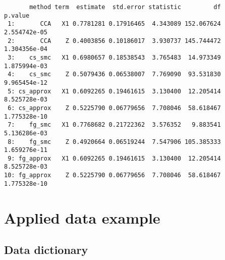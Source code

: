 \documentclass[
  12pt,
  a4paper,
]{article}
\begin{document}
\begin{verbatim}
       method term  estimate  std.error statistic         df      p.value
 1:       CCA   X1 0.7781281 0.17916465  4.343089 152.067624 2.554742e-05
 2:       CCA    Z 0.4003856 0.10186017  3.930737 145.744472 1.304356e-04
 3:    cs_smc   X1 0.6980657 0.18538543  3.765483  14.973349 1.875994e-03
 4:    cs_smc    Z 0.5079436 0.06538007  7.769090  93.531830 9.965454e-12
 5: cs_approx   X1 0.6092265 0.19461615  3.130400  12.205414 8.525728e-03
 6: cs_approx    Z 0.5225790 0.06779656  7.708046  58.618467 1.775328e-10
 7:    fg_smc   X1 0.7768682 0.21722362  3.576352   9.883541 5.136286e-03
 8:    fg_smc    Z 0.4920664 0.06519244  7.547906 105.385333 1.659276e-11
 9: fg_approx   X1 0.6092265 0.19461615  3.130400  12.205414 8.525728e-03
10: fg_approx    Z 0.5225790 0.06779656  7.708046  58.618467 1.775328e-10
\end{verbatim}

\newpage

\hypertarget{applied-data-example}{%
\section{Applied data example}\label{applied-data-example}}

\hypertarget{data-dictionary}{%
\subsection{Data dictionary}\label{data-dictionary}}
\end{document}

